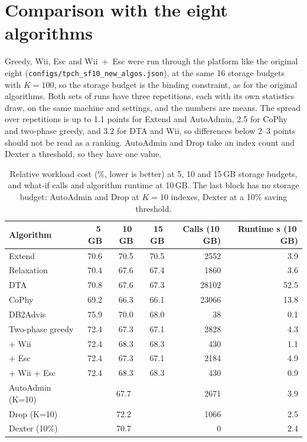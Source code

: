 \documentclass[11pt,a4paper]{article}
\begin{document}
\section{Comparison with the eight algorithms}\label{sec:compare}
Greedy, Wii, Esc and Wii~+~Esc were run through the platform like the original eight (\texttt{configs/tpch\_sf10\_new\_algos.json}), at the same 16 storage budgets with $K=100$, so the storage budget is the binding constraint, as for the original algorithms. Both sets of runs have three repetitions, each with its own statistics draw, on the same machine and settings, and the numbers are means. The spread over repetitions is up to 1.1 points for Extend and AutoAdmin, 2.5 for CoPhy and two-phase greedy, and 3.2 for DTA and Wii, so differences below 2--3 points should not be read as a ranking. AutoAdmin and Drop take an index count and Dexter a threshold, so they have one value.

\begin{table}[h]\centering\small
\begin{tabular}{lrrrrr}
\toprule
Algorithm & 5\,GB & 10\,GB & 15\,GB & Calls (10\,GB) & Runtime s (10\,GB)\\
\midrule
Extend & 70.6 & 70.5 & 70.5 & 2552 & 3.9\\
Relaxation & 70.4 & 67.6 & 67.4 & 1860 & 3.6\\
DTA & 70.8 & 67.6 & 67.3 & 28102 & 52.5\\
CoPhy & 69.2 & 66.3 & 66.1 & 23066 & 13.8\\
DB2Advis & 75.9 & 70.0 & 68.0 & 38 & 0.1\\
Two-phase greedy & 72.4 & 67.3 & 67.1 & 2828 & 4.3\\
\quad + Wii & 72.4 & 68.3 & 68.3 & 430 & 1.1\\
\quad + Esc & 72.4 & 67.3 & 67.1 & 2184 & 4.9\\
\quad + Wii + Esc & 72.4 & 68.3 & 68.3 & 430 & 0.9\\
\midrule
AutoAdmin (K=10) & \multicolumn{3}{c}{67.7} & 2671 & 3.9\\
Drop (K=10) & \multicolumn{3}{c}{72.2} & 1066 & 2.5\\
Dexter (10\%) & \multicolumn{3}{c}{70.7} & 0 & 2.4\\
\bottomrule
\end{tabular}
\caption{Relative workload cost (\%, lower is better) at 5, 10 and 15\,GB storage budgets, and what-if calls and algorithm runtime at 10\,GB. The last block has no storage budget: AutoAdmin and Drop at $K=10$ indexes, Dexter at a 10\% saving threshold.}\label{tab:compare}
\end{table}
\end{document}
